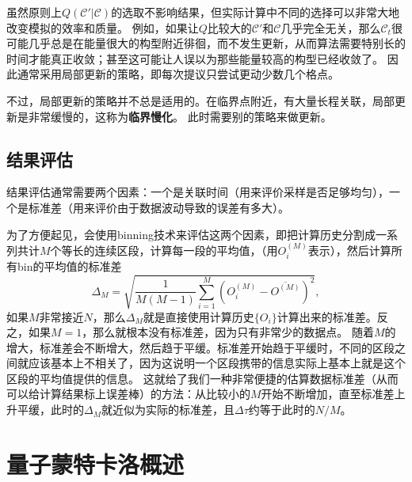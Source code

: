 \documentclass[hyperref, UTF8, a4paper]{ctexart}
\newcommand*{\concept}[1]{{\textbf{#1}}}
\begin{document}
虽然原则上$Q(\mathcal{C}' | \mathcal{C})$的选取不影响结果，但实际计算中不同的选择可以非常大地改变模拟的效率和质量。
例如，如果让$Q$比较大的$\mathcal{C}'$和$\mathcal{C}$几乎完全无关，那么$\mathcal{C}_t$很可能几乎总是在能量很大的构型附近徘徊，而不发生更新，从而算法需要特别长的时间才能真正收敛；甚至这可能让人误以为那些能量较高的构型已经收敛了。
因此通常采用局部更新的策略，即每次提议只尝试更动少数几个格点。

不过，局部更新的策略并不总是适用的。在临界点附近，有大量长程关联，局部更新是非常缓慢的，这称为\concept{临界慢化}。
此时需要别的策略来做更新。

\subsection{结果评估}

结果评估通常需要两个因素：一个是关联时间（用来评价采样是否足够均匀），一个是标准差（用来评价由于数据波动导致的误差有多大）。

为了方便起见，会使用binning技术来评估这两个因素，即把计算历史分割成一系列共计$M$个等长的连续区段，计算每一段的平均值，（用$O_i^{(M)}$表示），然后计算所有bin的平均值的标准差
\begin{equation}
    \Delta_M = \sqrt{\frac{1}{M(M-1)} \sum_{i=1}^M (O_i^{(M)} - \overline{O^{(M)}})^2},
\end{equation}
如果$M$非常接近$N$，那么$\Delta_M$就是直接使用计算历史$\{O_i\}$计算出来的标准差。反之，如果$M=1$，那么就根本没有标准差，因为只有非常少的数据点。
随着$M$的增大，标准差会不断增大，然后趋于平缓。标准差开始趋于平缓时，不同的区段之间就应该基本上不相关了，因为这说明一个区段携带的信息实际上基本上就是这个区段的平均值提供的信息。
这就给了我们一种非常便捷的估算数据标准差（从而可以给计算结果标上误差棒）的方法：从比较小的$M$开始不断增加，直至标准差上升平缓，此时的$\Delta_M$就近似为实际的标准差，且$\Delta \tau$约等于此时的$N/M$。

\section{量子蒙特卡洛概述}
\end{document}
